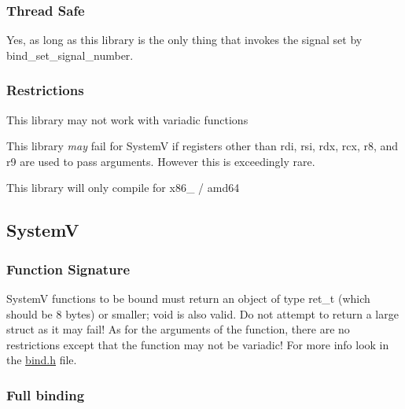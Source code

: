 \subsubsection*{Thread Safe}

Yes, as long as this library is the only thing that invokes the signal set by {\ttfamily bind\+\_\+set\+\_\+signal\+\_\+number}.

\subsubsection*{Restrictions}


\begin{DoxyEnumerate}
\item This library may not work with variadic functions
\end{DoxyEnumerate}
\begin{DoxyEnumerate}
\item This library {\itshape may} fail for SystemV if registers other than {\ttfamily rdi}, {\ttfamily rsi,} {\ttfamily rdx}, {\ttfamily rcx}, {\ttfamily r8}, and {\ttfamily r9} are used to pass arguments. However this is exceedingly rare.
\end{DoxyEnumerate}
\begin{DoxyEnumerate}
\item This library will only compile for {\ttfamily x86\+\_} / {\ttfamily amd64}
\end{DoxyEnumerate}

\subsection*{SystemV}

\subsubsection*{Function Signature}

SystemV functions to be bound must return an object of type {\ttfamily ret\+\_\+t} (which should be 8 bytes) or smaller; {\ttfamily void} is also valid. Do not attempt to return a large struct as it may fail! As for the arguments of the function, there are no restrictions except that the function may not be variadic! For more info look in the {\ttfamily \hyperlink{bind_8h}{bind.\+h}} file.

\subsubsection*{Full binding}

